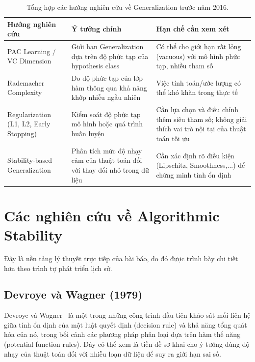 \begin{table}[H]
\centering
\caption{Tổng hợp các hướng nghiên cứu về Generalization trước năm 2016.}
\label{tab:tonghop-generalization}
\begin{tabular}{|p{3.3cm}|p{5cm}|p{5cm}|}
\hline
\textbf{Hướng nghiên cứu} & \textbf{Ý tưởng chính} & \textbf{Hạn chế cần xem xét} \\ \hline
PAC Learning / VC Dimension & Giới hạn Generalization dựa trên độ phức tạp của hypothesis class & Có thể cho giới hạn rất lỏng (vacuous) với mô hình phức tạp, nhiều tham số \\ \hline
Rademacher Complexity & Đo độ phức tạp của lớp hàm thông qua khả năng khớp nhiễu ngẫu nhiên & Việc tính toán/ước lượng có thể khó khăn trong thực tế \\ \hline
Regularization (L1, L2, Early Stopping) & Kiểm soát độ phức tạp mô hình hoặc quá trình huấn luyện & Cần lựa chọn và điều chỉnh thêm siêu tham số; không giải thích vai trò nội tại của thuật toán tối ưu \\ \hline
Stability-based Generalization & Phân tích mức độ nhạy cảm của thuật toán đối với thay đổi nhỏ trong dữ liệu & Cần xác định rõ điều kiện (Lipschitz, Smoothness,...) để chứng minh tính ổn định \\ \hline
\end{tabular}
\end{table}

\section{Các nghiên cứu về Algorithmic Stability}
\label{sec:nghiencuu-stability}

Đây là nền tảng lý thuyết trực tiếp của bài báo, do đó được trình bày chi tiết hơn theo trình tự phát triển lịch sử.

\subsection{Devroye và Wagner (1979)}

Devroye và Wagner~\cite{devroye1979distribution} là một trong những công trình đầu tiên khảo sát mối liên hệ giữa tính ổn định của một luật quyết định (decision rule) và khả năng tổng quát hóa của nó, trong bối cảnh các phương pháp phân loại dựa trên hàm thế năng (potential function rules). Đây có thể xem là tiền đề sơ khai cho ý tưởng dùng độ nhạy của thuật toán đối với nhiễu loạn dữ liệu để suy ra giới hạn sai số.

